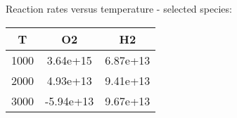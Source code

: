 \documentclass[11pt,letter]{article}
\begin{document}
Reaction rates versus temperature - selected species:\begin{table}[h]
\begin{tabular}{c|c|c}
\hline
T & O2 & H2\\
\hline
1000 & 3.64e+15 & 6.87e+13\\
\hline
2000 & 4.93e+13 & 9.41e+13\\
\hline
3000 & -5.94e+13 & 9.67e+13\\
\end{tabular}
\end{table}
\end{document}
